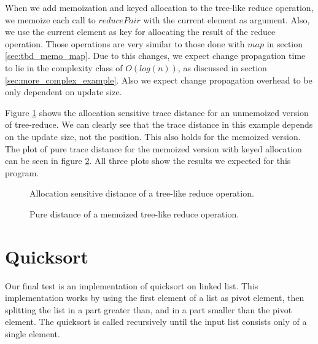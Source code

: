 When we add memoization and keyed allocation to the tree-like reduce operation, we memoize each call to $reducePair$ with the current element as argument. Also, we use the current element as key for allocating the result of the reduce operation. Those operations are very similar to those done with $map$ in section \ref{sec:tbd_memo_map}. Due to this changes, we expect change propagation time to lie in the complexity class of $O(log(n))$, as discussed in section \ref{sec:more_complex_example}. Also we expect change propagation overhead to be only dependent on update size. 

Figure \ref{plot:tree_reduce_alloc} shows the allocation sensitive trace distance for an unmemoized version of tree-reduce. We can clearly see that the trace distance in this example depends on the update size, not the position. This also holds for the memoized version. The plot of pure trace distance for the memoized version with keyed allocation can be seen in figure \ref{plot:memo_tree_reduce_pure}. All three plots show the results we expected for this program. 

\begin{figure}
\centering
{}
\caption{Allocation sensitive distance of a tree-like reduce operation.}
\label{plot:tree_reduce_alloc}
\end{figure}



\begin{figure}
\centering
{}
\caption{Pure distance of a memoized tree-like reduce operation.}
\label{plot:memo_tree_reduce_pure}
\end{figure}

\section{Quicksort}

Our final test is an implementation of quicksort on linked list. This implementation works by using the first element of a list as pivot element, then splitting the list in a part greater than, and in a part smaller than the pivot element. The quicksort is called recursively until the input list consists only of a single element. 

